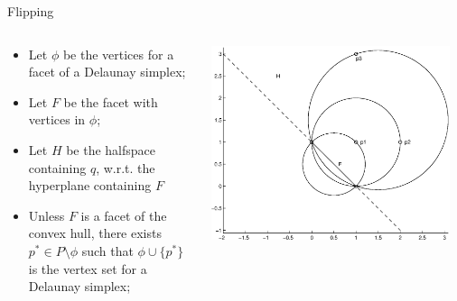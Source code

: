 \documentclass[xcolor=dvipsnames]{beamer}
\begin{document}
\begin{frame}{Flipping}
\begin{columns}
\begin{column}{.48\textwidth}
\begin{itemize}
\item Let $\phi$ be the vertices for a facet of a Delaunay simplex;
\item Let $F$ be the facet with vertices in $\phi$;
\item Let $H$ be the halfspace containing $q$, w.r.t. the hyperplane containing
$F$
\item Unless $F$ is a facet of the convex hull, there exists
$p^* \in P \setminus \phi$ such that $\phi \cup \{p^*\}$
is the vertex set for a Delaunay simplex;
\end{itemize}
\end{column}
\begin{column}{.48\textwidth}
\includegraphics[width=0.95\textwidth]{circles.eps}
\end{column}
\end{columns}
\end{frame}
\end{document}
